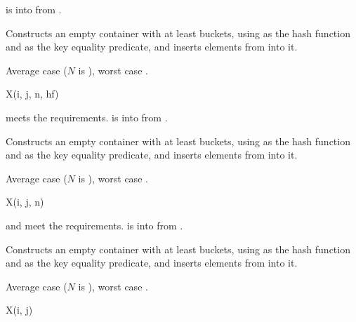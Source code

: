 \begin{itemdescr}
\pnum
\expects
{} is
 into  from .

\pnum
\effects
Constructs an empty container with at least  buckets,
using  as the hash function and
 as the key equality predicate, and
inserts elements from  into it.

\pnum
\complexity
Average case  ($N$ is ), worst case .
\end{itemdescr}

\begin{itemdecl}
X(i, j, n, hf)
\end{itemdecl}

\begin{itemdescr}
\pnum
\expects
{} meets the  requirements.
 is
 into  from .

\pnum
\effects
Constructs an empty container with at least  buckets,
using  as the hash function and
 as the key equality predicate, and
inserts elements from  into it.

\pnum
\complexity
Average case  ($N$ is ), worst case .
\end{itemdescr}

\begin{itemdecl}
X(i, j, n)
\end{itemdecl}

\begin{itemdescr}
\pnum
\expects
{} and  meet
the  requirements.
 is
 into  from .

\pnum
\effects
Constructs an empty container with at least  buckets,
using  as the hash function and
 as the key equality predicate, and
inserts elements from  into it.

\pnum
\complexity
Average case  ($N$ is ), worst case .
\end{itemdescr}

\begin{itemdecl}
X(i, j)
\end{itemdecl}

